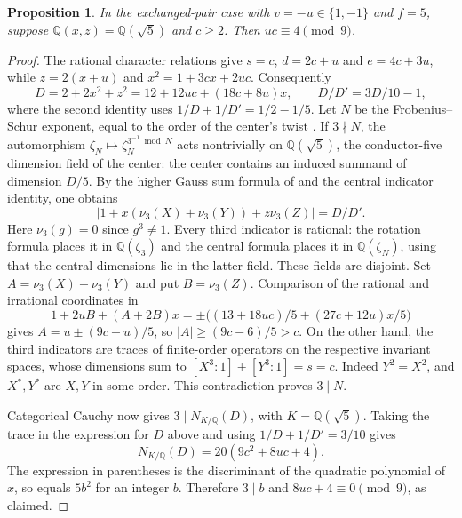 \documentclass[11pt,a4paper]{article}
\newtheorem{proposition}[theorem]{Proposition}
\numberwithin{equation}{section}
\begin{document}
\begin{proposition}
In the exchanged-pair case with $v=-u\in\{1,-1\}$ and $f=5$, suppose $\mathbb Q(x,z)=\mathbb Q(\sqrt5)$ and $c\ge2$. Then $uc\equiv4\pmod9$.
\end{proposition}
\begin{proof}
The rational character relations give
$s=c$, $d=2c+u$ and $e=4c+3u$, while $z=2(x+u)$ and
$x^2=1+3cx+2uc$. Consequently
\[
 D=2+2x^2+z^2=12+12uc+(18c+8u)x,\qquad
 D/D'=3D/10-1,
\]
where the second identity uses $1/D+1/D'=1/2-1/5$.
Let $N$ be the Frobenius--Schur exponent, equal to the order of the
center's twist \cite[Theorem~5.5]{NSExp}. If $3\nmid N$, the automorphism
$\zeta_N\mapsto\zeta_N^{3^{-1}\bmod N}$ acts nontrivially on
$\mathbb Q(\sqrt5)$, the conductor-five dimension field of the center:
the center contains an induced summand of dimension $D/5$. By the
higher Gauss sum formula of \cite[Theorem~4.4, equation~(4.17), in the arXiv version]{NSW} and the central indicator
identity, one obtains
\[
 \left|1+x(\nu_3(X)+\nu_3(Y))+z\nu_3(Z)\right|=D/D'.
\]
Here $\nu_3(g)=0$ since $g^3\ne1$. Every third indicator is rational:
the rotation formula places it in $\mathbb Q(\zeta_3)$ and the central
formula places it in $\mathbb Q(\zeta_N)$, using that the central
dimensions lie in the latter field. These fields are disjoint.
Set $A=\nu_3(X)+\nu_3(Y)$ and put $B=\nu_3(Z)$.
Comparison of the rational and irrational coordinates in
\[
 1+2uB+(A+2B)x
 =\pm\bigl((13+18uc)/5+(27c+12u)x/5\bigr)
\]
gives $A=u\pm(9c-u)/5$, so $|A|\ge(9c-6)/5>c$.
On the other hand, the third indicators are traces of finite-order
operators on the respective invariant spaces, whose dimensions sum to
$[X^3:1]+[Y^3:1]=s=c$. Indeed $Y^2=X^2$, and $X^*,Y^*$ are $X,Y$
in some order. This contradiction proves $3\mid N$.

Categorical Cauchy now gives $3\mid N_{K/\mathbb Q}(D)$, with
$K=\mathbb Q(\sqrt5)$. Taking the trace in the expression for $D$ above
and using $1/D+1/D'=3/10$ gives
\[
 N_{K/\mathbb Q}(D)=20(9c^2+8uc+4).
\]
The expression in parentheses is the discriminant of the quadratic
polynomial of $x$, so equals $5b^2$ for an integer $b$. Therefore $3\mid b$
and $8uc+4\equiv0\pmod9$, as claimed.
\end{proof}



\end{document}
